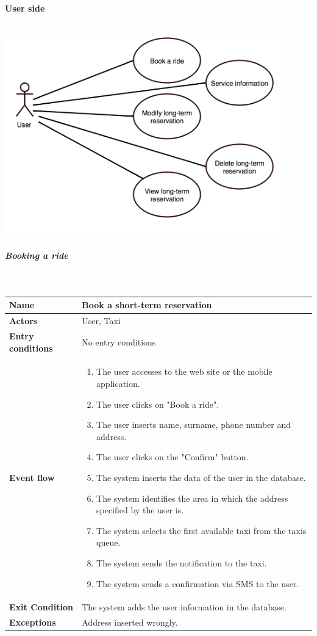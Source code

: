 \newpage
\paragraph{User side}
	\begin{center}
	~\\
\includegraphics[width=0.90\textwidth]{./images/UseCaseUser.png}~
	\end{center}
\newpage
\subparagraph{Booking a ride}
~\\[0.2cm]
	\vspace{20pt}
\noindent

\begin{tabular}{l l}
 \textbf {Name} & Book a short-term reservation  \\ \hline
 \textbf{Actors} & User, Taxi \\ \hline
 \textbf{Entry conditions} & No entry conditions \\ \hline
 \textbf{Event flow} & 
 \parbox{0.7\textwidth}{
 \begin{enumerate}
 \item The user accesses to the web site or the mobile application.
 \item The user clicks on "Book a ride".
 \item The user inserts name, surname, phone number and address.
 \item The user clicks on the "Confirm" button.
 \item The system inserts the data of the user in the database.
 \item The system identifies the area in which the address specified by the user is.
 \item The system selects the first available taxi from the taxis queue.
 \item The system sends the notification to the taxi.
 \item The system sends a confirmation via SMS to the user.
 \end{enumerate}
 } \\ \hline
 \textbf{Exit Condition} & \parbox{0.7\textwidth}{ The system adds the user information in the database.}\\ \hline
 \textbf{Exceptions} & Address inserted wrongly.
\end{tabular}

